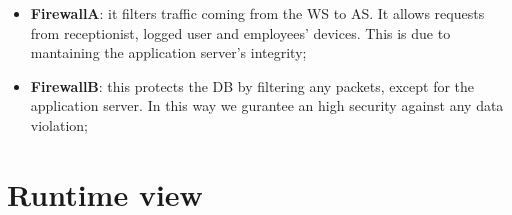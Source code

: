 \begin{itemize}

\item \textbf{FirewallA}: it filters traffic coming from the WS to AS. It allows requests from receptionist, logged user and employees' devices. This is due to mantaining the application server's integrity;

\item \textbf{FirewallB}: this protects the DB by filtering any packets, except for the application server. In this way we gurantee an high security against any data violation; 
\end{itemize}




\section{Runtime view}




\begin{figure}[H]
  \label{ReservatioSD}
  \centering
    \caption{}
\end{figure} 


\begin{figure}[H]
  \label{VisitSD}
  \centering
    \caption{}
\end{figure} 


